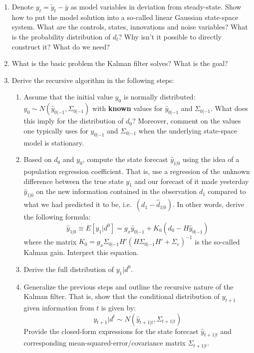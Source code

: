\begin{enumerate}

\item Denote \(y_t = \tilde{y}_t - \bar{y}\) as model variables in deviation from steady-state.
Show how to put the model solution into a so-called linear Gaussian state-space system.
What are the controls, states, innovations and noise variables?
What is the probability distribution of \(d_t\)?
Why isn't it possible to directly construct it? What do we need?

\item What is the basic problem the Kalman filter solves? What is the goal?

\item Derive the recursive algorithm in the following steps:

\begin{enumerate}

\item Assume that the initial value \(y_0\) is normally distributed: \(y_0 \sim N(\hat{y}_{0|-1},\Sigma_{0|-1})\) with \textbf{known} values for \(\hat{y}_{0|-1}\) and \(\Sigma_{0|-1}\).
What does this imply for the distribution of \(d_0\)?
Moreover, comment on the values one typically uses for \(\hat{y}_{0|-1}\) and \(\Sigma_{0|-1}\) when the underlying state-space model is stationary.

\item Based on \(d_0\) and \(y_0\), compute the state forecast \(\hat{y}_{1|0}\) using the idea of a population regression coefficient.
That is, use a regression of the unknown difference between the true state \(y_1\)
  and our forecast of it made yesterday \(\hat{y}_{1|0}\) on the new information contained in the observation \(d_1\) compared to what we had predicted it to be, i.e.\
  \((d_1 - \hat{d}_{1|0})\).
In other words, derive the following formula:
\begin{equation*}
\hat{y}_{1|0} \equiv E[y_1|d^0] = g_x \hat{y}_{0|-1} + K_0\left(d_0-H\hat{y}_{0|-1}\right)
\end{equation*}
where the matrix \(K_0 = g_x \Sigma_{0|-1} H'{\left(H\Sigma_{0|-1}H' + \Sigma_e\right)}^{-1}\) is the so-called Kalman gain.
Interpret this equation.

\item Derive the full distribution of \(y_1|d^0\).

\item Generalize the previous steps and outline the recursive nature of the Kalman filter.
That is, show that the conditional distribution of \(y_{t+1}\) given information from \(t\) is given by:
\begin{equation*}
y_{t+1}|d^t \sim N(\hat{y}_{t+1|t},\Sigma_{t+1|t})
\end{equation*}
Provide the closed-form expressions for the state forecast \(\hat{y}_{t+1|t}\) and corresponding mean-squared-error/covariance matrix \(\Sigma_{t+1|t}\).


\end{enumerate}
\end{enumerate}
